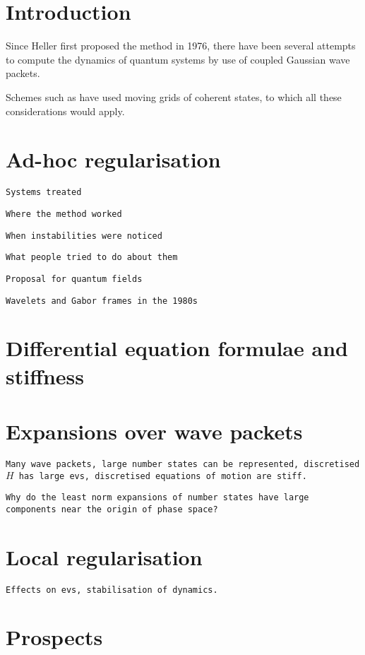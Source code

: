 \documentclass[aip,jcp,graphicx,draft]{revtex4-1}
\begin{document}
\section{Introduction}

Since Heller first proposed the method in 1976\cite{jcp-64-63}, there have been several attempts to compute the dynamics of quantum systems by use of coupled Gaussian wave packets.

Schemes such as \cite{jcp-132-244111,jcp-136-014109} have used moving grids of coherent states, to which all these considerations would apply.

\section{Ad-hoc regularisation}

{\tt Systems treated}

{\tt Where the method worked}

{\tt When instabilities were noticed}

{\tt What people tried to do about them}

{\tt Proposal for quantum fields}

{\tt Wavelets and Gabor frames in the 1980s}

\section{Differential equation formulae and stiffness}

\section{Expansions over wave packets}

{\tt Many wave packets, large number states can be represented, discretised $H$ has large evs, discretised equations of motion are stiff.}

{\tt Why do the least norm expansions of number states have large components near the origin of phase space?}

\section{Local regularisation}

{\tt Effects on evs, stabilisation of dynamics.}

\section{Prospects}
\end{document}
